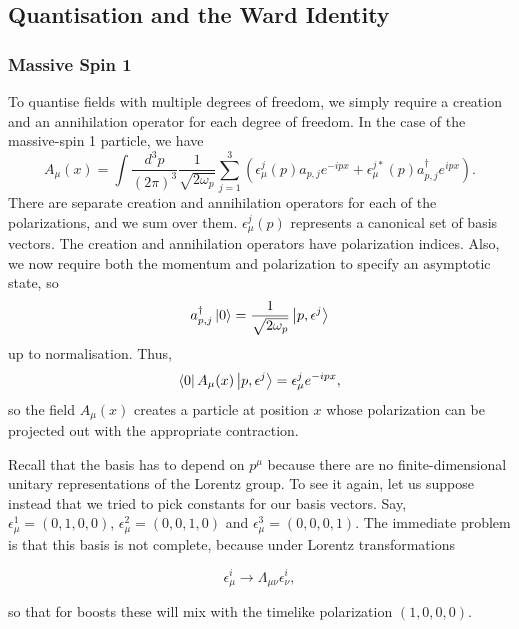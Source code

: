\documentclass[11pt]{article}
\theoremstyle{definition}
\begin{document}
\subsection{Quantisation and the Ward Identity}
\subsubsection{Massive Spin 1}
To quantise fields with multiple degrees of freedom, we simply require a creation and an annihilation operator for each degree of freedom. In the case of the massive-spin 1 particle, we have
\begin{equation}
    A_\mu(x) = \int\frac{d^3p}{(2\pi)^3}\frac{1}{\sqrt{2\omega_p}}\sum_{j=1}^3(\epsilon_\mu^j(p)a_{p,j}e^{-ipx} + \epsilon_\mu^{j*}(p)a_{p,j}^\dagger e^{ipx}).
\end{equation}
There are separate creation and annihilation operators for each of the polarizations, and we sum over them. $\epsilon_\mu^j(p)$ represents a canonical set of basis vectors. The creation and annihilation operators have polarization indices. Also, we now require both the momentum and polarization to specify an asymptotic state, so
\begin{equation}
    a_{p,j}^\dagger\ket{0} = \frac{1}{\sqrt{2\omega_p}}\ket{p, \epsilon^j}
\end{equation}
up to normalisation. Thus,
\begin{equation}
    \bra{0}A_\mu(x)\ket{p, \epsilon^j} = \epsilon_\mu^je^{-ipx},
\end{equation}
so the field $A_\mu(x)$ creates a particle at position $x$ whose polarization can be projected out with the appropriate contraction.

Recall that the basis has to depend on \(p^{\mu}\) because there are no finite-dimensional unitary representations of the Lorentz group. To see it again, let us suppose instead that we tried to pick constants for our basis vectors. Say, \(\epsilon^{1}_{\mu}=(0,1,0,0)\), \(\epsilon^{2}_{\mu}=(0,0,1,0)\) and \(\epsilon^{3}_{\mu}=(0,0,0,1)\). The immediate problem is that this basis is not complete, because under Lorentz transformations

\begin{equation}
    \epsilon^{i}_{\mu}\to\Lambda_{\mu\nu}\epsilon^{i}_{\nu}, 
\end{equation}

so that for boosts these will mix with the timelike polarization \((1,0,0,0)\).
\end{document}
